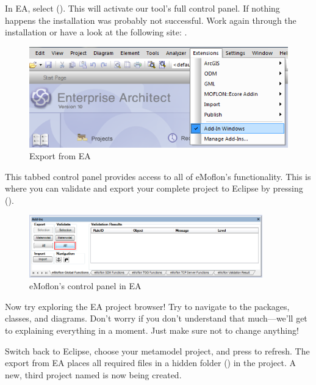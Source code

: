 \begin{stepbystep}
\item In EA, select  ().
This will activate our tool's full control panel.
If nothing happens the installation was probably not successful. 
Work again through the installation or have a look at the following site:
\newline
{}.
%
\begin{figure}[htbp]
	\centering
  \includegraphics[width=1\textwidth]{../../org.moflon.doc.handbook.01_installation/2_simpleDemo/EADemo/images/ea_extensionMenu}
	\caption{Export from EA} 
	\label{ea:validate_dropdown} 
\end{figure}
%
\item
This tabbed control panel provides access to all of eMoflon's functionality.
This is where you can validate and export your complete project to Eclipse by pressing  ().
%
\begin{figure}[htbp]
	\centering
  \includegraphics[width=0.9\textwidth]{../../org.moflon.doc.handbook.01_installation/2_simpleDemo/EADemo/images/ea_controlPanelValidateAll}
	\caption{eMoflon's control panel in EA} 
	\label{ea:controlPanel} 
\end{figure}
%
\item
Now try exploring the EA project browser!
Try to navigate to the packages, classes, and diagrams.
Don't worry if you don't understand that much---we'll get to explaining everything in a moment.
Just make sure not to change anything!

\item Switch back to Eclipse, choose your metamodel project, and press  to refresh. 
The export from EA places all required files in a hidden folder () in the project.
A new, third project named  is now being created.


\end{stepbystep}
